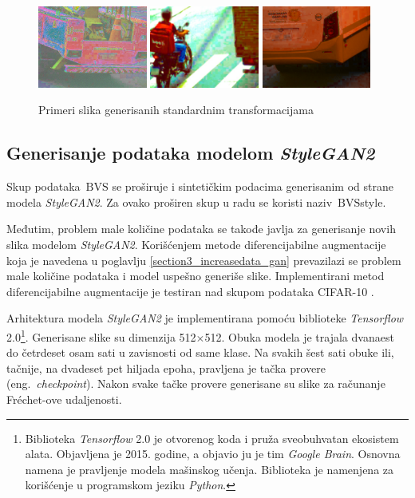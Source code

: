 \documentclass[12pt,oneside]{memoir}
\newcommand{\bvs}{\ensuremath{\,\textrm{BVS}}}
\begin{document}
\begin{figure}[!htbp]
  \includegraphics[width=0.32\textwidth]{matfmaster/glava4/basic_aug/7.jpg}
  \includegraphics[width=0.32\textwidth]{matfmaster/glava4/basic_aug/8.jpg}
  \includegraphics[width=0.32\textwidth]{matfmaster/glava4/basic_aug/9.jpg}
\caption{Primeri slika generisanih standardnim transformacijama}\label{fig:basic_aug}
\end{figure}

 
\subsection{Generisanje podataka modelom \textit{StyleGAN2}}

Skup podataka \bvs{} se proširuje i sintetičkim podacima generisanim od strane modela \textit{StyleGAN2}. Za ovako proširen skup u radu se koristi naziv \bvs{style}. 

Međutim, problem male količine podataka se takođe javlja za generisanje novih slika modelom \textit{StyleGAN2}. Korišćenjem metode diferencijabilne augmentacije koja je navedena u poglavlju \ref{section3_increasedata_gan} prevazilazi se problem male količine podataka i model uspešno generiše slike. Implementirani metod diferencijabilne augmentacije je testiran nad skupom podataka CIFAR-10 \cite{2020diffaugment_report}.

Arhitektura modela \textit{StyleGAN2} je implementirana pomoću biblioteke \textit{Tensorflow} 2.0\footnote{Biblioteka \textit{Tensorflow} 2.0 je otvorenog koda i pruža sveobuhvatan ekosistem alata. Objavljena je 2015. godine, a objavio ju je tim \textit{Google Brain}. Osnovna namena je pravljenje modela mašinskog učenja. Biblioteka je namenjena za korišćenje u programskom jeziku \textit{Python}.}.
Generisane slike su dimenzija 512\(\times\)512. Obuka modela je trajala dvanaest do četrdeset osam sati u zavisnosti od same klase. Na svakih šest sati obuke ili, tačnije, na dvadeset pet hiljada epoha, pravljena je tačka provere (eng.~\textit{checkpoint}). Nakon svake tačke provere generisane su slike za računanje Fréchet-ove udaljenosti.
\end{document}
